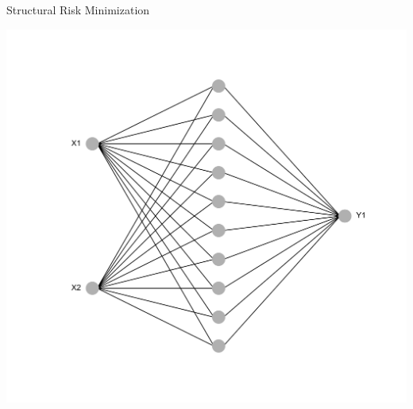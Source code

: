 \documentclass[11pt,compress,t,notes=noshow, xcolor=table]{beamer}
\begin{document}
\begin{frame} {Structural Risk Minimization}
{\begin{center}
\begin{minipage}{0.5\textwidth}
\end{minipage}%
\begin{minipage}{0.5\textwidth}
\includegraphics[width=\linewidth]{figure/nn_size_10.png}
\end{minipage}
\end{center}
}


\end{frame}
\end{document}
